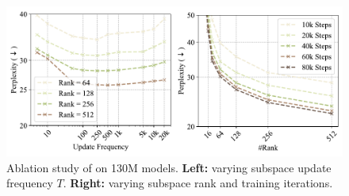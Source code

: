 \begin{figure}
    \centering
        
    \includegraphics[width=\linewidth]{figures/files/ablation.pdf}
    \caption{\small{Ablation study of \lowrank{} on 130M models. \textbf{Left:} varying subspace update frequency $T$. \textbf{Right:} varying subspace rank and training iterations.}}
    \vspace{-7mm}
    \label{fig:ablation}
\end{figure} 